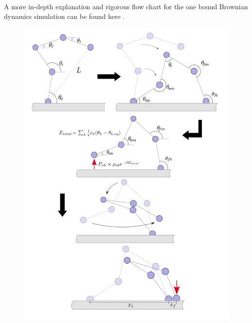 A more in-depth explanation and rigorous flow chart for the one bound Brownian dynamics simulation can be found here \cite{Capek2017, }.

\newpage
	\begin{figure}[H]
	\centering
	\includegraphics[width=1\columnwidth]{Figures/algorithm.png}
	\label{fig:alg}
	\end{figure}
	



